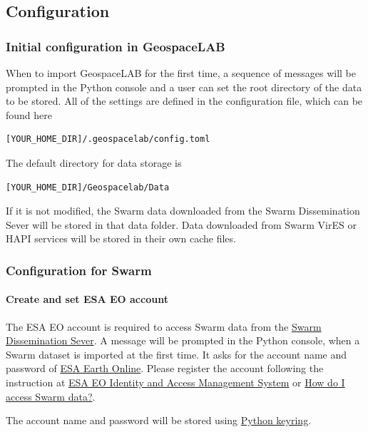 \subsection{Configuration}

\subsubsection{Initial configuration in GeospaceLAB}

When to import GeospaceLAB for the first time, a sequence of messages will be prompted in the Python console and a user can set the root directory of the data to be stored. All of the settings are defined in the configuration file, which can be found here

\begin{verbatim}
[YOUR_HOME_DIR]/.geospacelab/config.toml
\end{verbatim}

The default directory for data storage is

\begin{verbatim}
[YOUR_HOME_DIR]/Geospacelab/Data
\end{verbatim}

If it is not modified, the Swarm data downloaded from the Swarm Dissemination Sever will be stored in that data folder. Data downloaded from Swarm VirES or HAPI services will be stored in their own cache files.

\subsubsection{Configuration for Swarm}

\paragraph{Create and set ESA EO account}

The ESA EO account is required to access Swarm data from the \href{https://swarm-diss.eo.esa.int/}{Swarm Dissemination Sever}. A message will be prompted in the Python console, when a Swarm dataset is imported at the first time. It asks for the account name and password of \href{https://earth.esa.int/eogateway}{ESA Earth Online}. Please register the account following the instruction at \href{https://eoiam-idp.eo.esa.int/}{ESA EO Identity and Access Management System} or \href{https://earth.esa.int/eogateway/faq/how-do-i-access-swarm-data}{How do I access Swarm data?}.

The account name and password will be stored using \href{https://github.com/jaraco/keyring}{Python keyring}.

